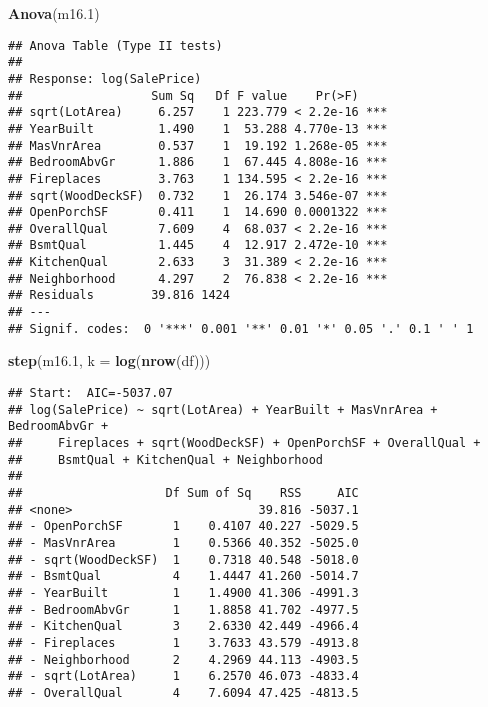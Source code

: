 \documentclass[
]{article}
\newenvironment{Shaded}{\begin{snugshade}}{\end{snugshade}}
\newcommand{\AttributeTok}[1]{\textcolor[rgb]{0.13,0.29,0.53}{#1}}
\newcommand{\FloatTok}[1]{\textcolor[rgb]{0.00,0.00,0.81}{#1}}
\newcommand{\FunctionTok}[1]{\textcolor[rgb]{0.13,0.29,0.53}{\textbf{#1}}}
\newcommand{\NormalTok}[1]{#1}
\begin{document}
\begin{Shaded}
\begin{Highlighting}[]
\FunctionTok{Anova}\NormalTok{(m16}\FloatTok{.1}\NormalTok{)}
\end{Highlighting}
\end{Shaded}

\begin{verbatim}
## Anova Table (Type II tests)
## 
## Response: log(SalePrice)
##                  Sum Sq   Df F value    Pr(>F)    
## sqrt(LotArea)     6.257    1 223.779 < 2.2e-16 ***
## YearBuilt         1.490    1  53.288 4.770e-13 ***
## MasVnrArea        0.537    1  19.192 1.268e-05 ***
## BedroomAbvGr      1.886    1  67.445 4.808e-16 ***
## Fireplaces        3.763    1 134.595 < 2.2e-16 ***
## sqrt(WoodDeckSF)  0.732    1  26.174 3.546e-07 ***
## OpenPorchSF       0.411    1  14.690 0.0001322 ***
## OverallQual       7.609    4  68.037 < 2.2e-16 ***
## BsmtQual          1.445    4  12.917 2.472e-10 ***
## KitchenQual       2.633    3  31.389 < 2.2e-16 ***
## Neighborhood      4.297    2  76.838 < 2.2e-16 ***
## Residuals        39.816 1424                      
## ---
## Signif. codes:  0 '***' 0.001 '**' 0.01 '*' 0.05 '.' 0.1 ' ' 1
\end{verbatim}

\begin{Shaded}
\begin{Highlighting}[]
\FunctionTok{step}\NormalTok{(m16}\FloatTok{.1}\NormalTok{, }\AttributeTok{k =} \FunctionTok{log}\NormalTok{(}\FunctionTok{nrow}\NormalTok{(df)))}
\end{Highlighting}
\end{Shaded}

\begin{verbatim}
## Start:  AIC=-5037.07
## log(SalePrice) ~ sqrt(LotArea) + YearBuilt + MasVnrArea + BedroomAbvGr + 
##     Fireplaces + sqrt(WoodDeckSF) + OpenPorchSF + OverallQual + 
##     BsmtQual + KitchenQual + Neighborhood
## 
##                    Df Sum of Sq    RSS     AIC
## <none>                          39.816 -5037.1
## - OpenPorchSF       1    0.4107 40.227 -5029.5
## - MasVnrArea        1    0.5366 40.352 -5025.0
## - sqrt(WoodDeckSF)  1    0.7318 40.548 -5018.0
## - BsmtQual          4    1.4447 41.260 -5014.7
## - YearBuilt         1    1.4900 41.306 -4991.3
## - BedroomAbvGr      1    1.8858 41.702 -4977.5
## - KitchenQual       3    2.6330 42.449 -4966.4
## - Fireplaces        1    3.7633 43.579 -4913.8
## - Neighborhood      2    4.2969 44.113 -4903.5
## - sqrt(LotArea)     1    6.2570 46.073 -4833.4
## - OverallQual       4    7.6094 47.425 -4813.5
\end{verbatim}
\end{document}
